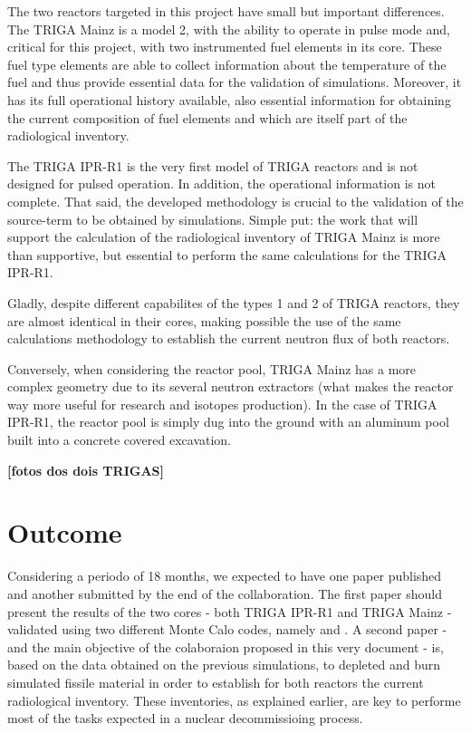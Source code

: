 \documentclass[11pt]{article} %
\begin{document}
The two reactors targeted in this project have small but important differences. The TRIGA Mainz is a model 2, with the ability to operate in pulse mode and, critical for this project, with two instrumented fuel elements in its core. These fuel type elements are able to collect information about the temperature of the fuel and thus provide essential data for the validation of simulations. Moreover, it has its full operational history available, also essential information for obtaining the current composition of fuel elements and which are itself part of the radiological inventory.

The TRIGA IPR-R1 is the very first model of TRIGA reactors and is not designed for pulsed operation. In addition, the operational information is not complete. That said, the developed methodology is crucial to the validation of the source-term to be obtained by simulations. Simple put: the work that will support the calculation of the radiological inventory of TRIGA Mainz is more than supportive, but essential to perform the same calculations for the TRIGA IPR-R1.

Gladly, despite different capabilites of the types 1 and 2 of TRIGA reactors, they are almost identical in their cores, making possible the use of the same calculations methodology to establish the current neutron flux of both reactors.

Conversely, when considering the reactor pool, TRIGA Mainz has a more complex geometry due to its several neutron extractors (what makes the reactor way more useful for research and isotopes production). In the case of TRIGA IPR-R1, the reactor pool is simply dug into the ground with an aluminum pool built into a concrete covered excavation.

\textbf{[fotos dos dois TRIGAS]}

\section{Outcome}

Considering a periodo of 18 months, we expected to have one paper published and another submitted by the end of the collaboration. The first paper should present the results of the two cores - both TRIGA IPR-R1 and TRIGA Mainz - validated using two different Monte Calo codes, namely \cite[OpenMC]{OpenMC_2015} and \cite[SCALE]{SCALE_632}. A second paper - and the main objective of the colaboraion proposed in this very document - is, based on the data obtained on the previous simulations, to depleted and burn simulated fissile material in order to establish for both reactors the current radiological inventory. These inventories, as explained earlier, are key to performe most of the tasks expected in a nuclear decommissioing process.
\end{document}
